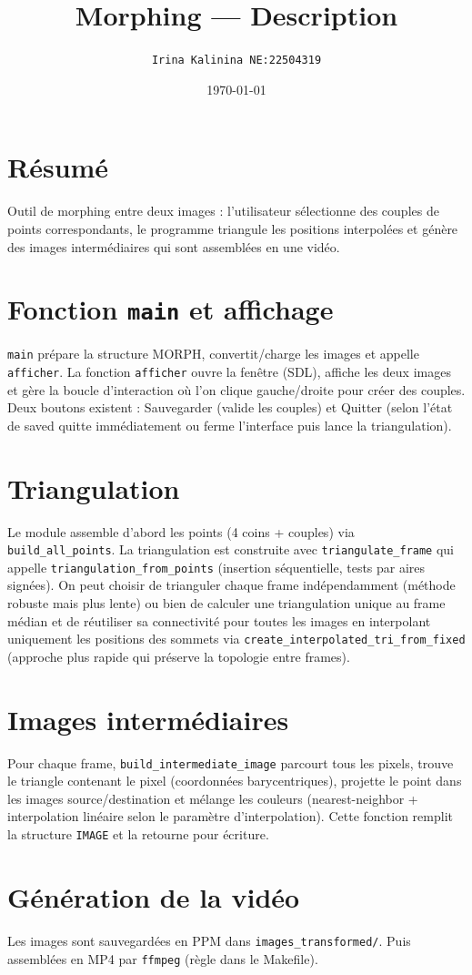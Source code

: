 \documentclass[11pt,a4paper]{article}
\title{Morphing — Description}
\author{\texttt{Irina Kalinina NE:22504319}}
\date{\today}
\begin{document}
\maketitle

\section*{Résumé}

Outil de morphing entre deux images : l'utilisateur sélectionne des
couples de points correspondants, le programme triangule les positions
interpolées et génère des images intermédiaires qui sont assemblées en
une vidéo.

\section{Fonction \texttt{main} et affichage}

\texttt{main} prépare la structure MORPH, convertit/charge les images et
appelle \texttt{afficher}. La fonction \texttt{afficher} ouvre la fenêtre (SDL),
affiche les deux images et gère la boucle d'interaction où l'on clique
gauche/droite pour créer des couples. Deux boutons existent :
Sauvegarder (valide les couples) et Quitter (selon l'état de
saved quitte immédiatement ou ferme l'interface puis lance la
triangulation).

\section{Triangulation}

Le module assemble d'abord les points (4 coins + couples) via
			\texttt{build\_all\_points}. La triangulation est construite avec
			\texttt{triangulate\_frame} qui appelle \texttt{triangulation\_from\_points}
(insertion séquentielle, tests par aires signées). On peut choisir
de trianguler chaque frame indépendamment (méthode robuste mais plus
lente) ou bien de calculer une triangulation unique au frame médian
et de réutiliser sa connectivité pour toutes les images en
interpolant uniquement les positions des sommets via
	\texttt{create\_interpolated\_tri\_from\_fixed} (approche plus rapide qui
préserve la topologie entre frames).

\section{Images intermédiaires}

Pour chaque frame, \texttt{build\_intermediate\_image} parcourt tous les
pixels, trouve le triangle contenant le pixel (coordonnées
barycentriques), projette le point dans les images source/destination
et mélange les couleurs (nearest-neighbor + interpolation linéaire
selon le paramètre d'interpolation). Cette fonction remplit la
structure \texttt{IMAGE} et la retourne pour écriture.

\section{Génération de la vidéo}

Les images sont sauvegardées en PPM dans \texttt{images\_transformed/}.
Puis assemblées en MP4 par \texttt{ffmpeg} (règle dans le Makefile).
\end{document}

